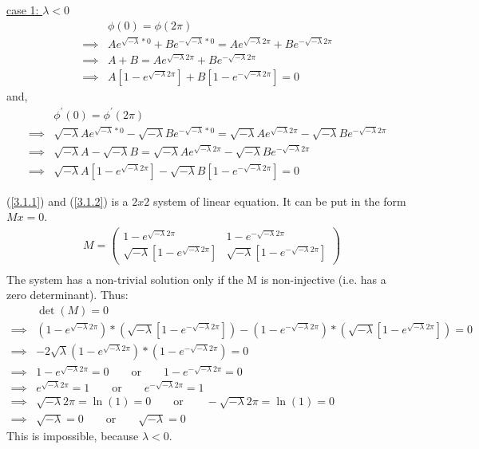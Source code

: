 \documentclass{article}
\begin{document}
\underline{case 1: $\lambda < 0$}
\begin{align}
  &\phi(0) = \phi(2\pi) \nonumber \\
  \implies&
  A e^{\sqrt{-\lambda} * 0} + B e^{-\sqrt{-\lambda} * 0}
  = A e^{\sqrt{-\lambda} 2\pi} + B e^{-\sqrt{-\lambda} 2\pi} \nonumber \\
  \implies&
  A+ B
  = A e^{\sqrt{-\lambda} 2\pi} + B e^{-\sqrt{-\lambda} 2\pi} \nonumber \\
  \implies&
  A[1 - e^{\sqrt{-\lambda} 2\pi}] + B [1 - e^{-\sqrt{-\lambda} 2\pi}] = 0 \label{3.1.1}
\end{align}
and,
\begin{align}
  &\phi^{\prime}(0) = \phi^{\prime}(2\pi) \nonumber \\
  \implies& 
  \sqrt{-\lambda} A e^{\sqrt{-\lambda} * 0} - \sqrt{-\lambda} B e^{-\sqrt{-\lambda} * 0} 
  = 
  \sqrt{-\lambda} A e^{\sqrt{-\lambda} 2\pi} - \sqrt{-\lambda} B e^{-\sqrt{-\lambda} 2\pi} \nonumber \\
  \implies& 
  \sqrt{-\lambda} A - \sqrt{-\lambda} B
  = 
  \sqrt{-\lambda} A e^{\sqrt{-\lambda} 2\pi} - \sqrt{-\lambda} B e^{-\sqrt{-\lambda} 2\pi} \nonumber \\
  \implies& 
  \sqrt{-\lambda} A [1 - e^{\sqrt{-\lambda} 2\pi}] - \sqrt{-\lambda} B [1 - e^{-\sqrt{-\lambda} 2\pi}]
  = 0 \label{3.1.2}
\end{align}

(\ref{3.1.1}) and (\ref{3.1.2}) is a $2x2$ system of linear equation. It can be put in the form $Mx = 0$.
\begin{align*}
  &M = \begin{pmatrix}
    1 - e^{\sqrt{-\lambda} 2\pi} & 1 - e^{-\sqrt{-\lambda} 2\pi} \\
    \sqrt{-\lambda}[1 - e^{\sqrt{-\lambda} 2\pi}] & \sqrt{-\lambda}[1 - e^{-\sqrt{-\lambda} 2\pi}]
  \end{pmatrix} \\
\end{align*}
The system has a non-trivial solution only if the M is non-injective (i.e. has a zero determinant). Thus:
\begin{align*}
  &\det(M) = 0 \\
  \implies& (1 - e^{\sqrt{-\lambda} 2\pi}) * (\sqrt{-\lambda}[1 - e^{-\sqrt{-\lambda} 2\pi}])
  -
  (1 - e^{-\sqrt{-\lambda} 2\pi}) * (\sqrt{-\lambda}[1 - e^{\sqrt{-\lambda} 2\pi}])
  = 0 \\
  \implies& -2 \sqrt{\lambda} (1 - e^{\sqrt{-\lambda} 2\pi}) * (1 - e^{-\sqrt{-\lambda} 2\pi}) = 0 \\
  \implies& 1 - e^{\sqrt{-\lambda} 2\pi} = 0  \qquad \text{or} \qquad 1 - e^{-\sqrt{-\lambda} 2\pi} = 0 \\
  \implies& e^{\sqrt{-\lambda} 2\pi} = 1  \qquad \text{or} \qquad  e^{-\sqrt{-\lambda} 2\pi} = 1 \\
  \implies& \sqrt{-\lambda} 2\pi = \ln(1) = 0  \qquad \text{or} \qquad  -\sqrt{-\lambda} 2\pi = \ln(1) = 0 \\
  \implies& \sqrt{-\lambda} = 0  \qquad \text{or} \qquad  \sqrt{-\lambda} = 0
\end{align*}
This is impossible, because $\lambda < 0$.
\end{document}
